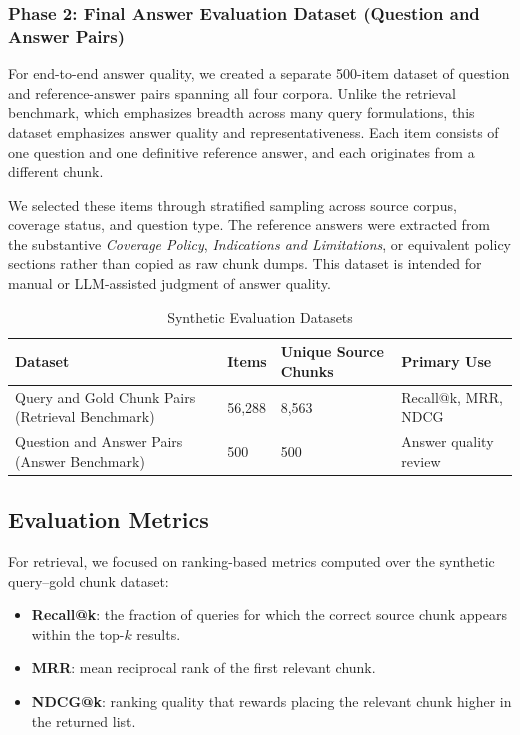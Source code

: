 \documentclass[10pt, letterpaper]{article}
\begin{document}
\subsubsection{Phase 2: Final Answer Evaluation Dataset (Question and Answer Pairs)}

For end-to-end answer quality, we created a separate 500-item dataset of question and
reference-answer pairs spanning all four corpora. Unlike the retrieval benchmark, which
emphasizes breadth across many query formulations, this dataset emphasizes answer
quality and representativeness. Each item consists of one question and one definitive
reference answer, and each originates from a different chunk.

We selected these items through stratified sampling across source corpus, coverage
status, and question type. The reference answers were extracted from the substantive
\textit{Coverage Policy}, \textit{Indications and Limitations}, or equivalent policy
sections rather than copied as raw chunk dumps. This dataset is intended for manual or
LLM-assisted judgment of answer quality.

\begin{table}[h]
\centering
\caption{Synthetic Evaluation Datasets}
\label{tab:evaldatasets}
\begin{tabular}{@{}p{5.0cm}p{1.2cm}p{3.0cm}p{3.2cm}@{}}
\toprule
\textbf{Dataset} & \textbf{Items} & \textbf{Unique Source Chunks} & \textbf{Primary Use} \\
\midrule
Query and Gold Chunk Pairs (Retrieval Benchmark) & 56,288 & 8,563 & Recall@k, MRR, NDCG \\
Question and Answer Pairs (Answer Benchmark) & 500 & 500 & Answer quality review \\
\bottomrule
\end{tabular}
\end{table}


\subsection{Evaluation Metrics}

For retrieval, we focused on ranking-based metrics computed over the synthetic
query--gold chunk dataset:

\begin{itemize}[noitemsep, topsep=4pt]
    \item \textbf{Recall@k}: the fraction of queries for which the correct source chunk
          appears within the top-$k$ results.
    \item \textbf{MRR}: mean reciprocal rank of the first relevant chunk.
    \item \textbf{NDCG@k}: ranking quality that rewards placing the relevant chunk
          higher in the returned list.
\end{itemize}
\end{document}
